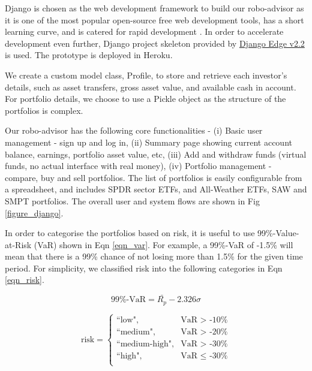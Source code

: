 \documentclass{article}
\begin{document}
Django is chosen as the web development framework to build our robo-advisor as it is one of the most popular open-source free web development tools, has a short learning curve, and is catered for rapid development \cite{vincent2020django}. In order to accelerate development even further, Django project skeleton provided by \href{https://django-edge.readthedocs.io/en/latest/}{Django Edge v2.2} is used. The prototype is deployed in Heroku.

We create a custom model class, Profile, to store and retrieve each investor's details, such as asset transfers, gross asset value, and available cash in account. For portfolio details, we choose to use a Pickle object as the structure of the portfolios is complex.

Our robo-advisor has the following core functionalities - (i) Basic user management - sign up and log in, (ii) Summary page showing current account balance, earnings, portfolio asset value, etc, (iii) Add and withdraw funds (virtual funds, no actual interface with real money), (iv) Portfolio management - compare, buy and sell portfolios. The list of portfolios is easily configurable from a spreadsheet, and includes SPDR sector ETFs, and All-Weather ETFs, SAW and SMPT portfolios. The overall user and system flows are shown in Fig \ref{figure_django}.

In order to categorise the portfolios based on risk, it is useful to use 99\%-Value-at-Risk (VaR) shown in Eqn \ref{eqn_var}. For example, a 99\%-VaR of -1.5\% will mean that there is a 99\% chance of not losing more than 1.5\% for the given time period. For simplicity, we classified risk into the following categories in Eqn \ref{eqn_risk}.

\begin{equation}
\text{99\%-VaR} = \bar{R_p} - 2.326\sigma  \label{eqn_var}
\end{equation}

\begin{equation} \label{eqn_risk}
\text{risk} = \begin{cases}
  \text{``low"}, &\text{VaR $>$ -10\%}  \\
  \text{``medium"}, &\text{VaR $>$ -20\%}  \\
  \text{``medium-high"}, &\text{VaR $>$ -30\%}  \\
  \text{``high"}, &\text{VaR $\leqslant$ -30\%} \\
\end{cases}
\end{equation}
\end{document}
